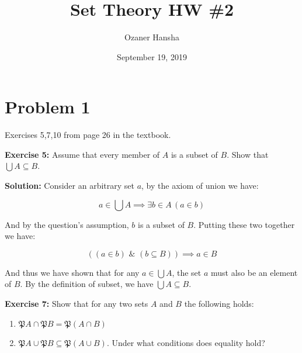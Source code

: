 \documentclass{article}
\begin{document}
\title{Set Theory HW \#2}
\author{Ozaner Hansha}
\date{September 19, 2019}
\maketitle

\newcommand{\pset}[1]{\mathfrak P#1}
\newcommand{\psetp}[1]{\mathfrak P(#1)}
\newcommand{\and}{\,\,\&\,\,}
\newcommand{\OR}{\text{ or }}
\newcommand{\pair}[2]{<#1,#2>}
\renewcommand{\setminus}{-}


\section*{Problem 1}
Exercises 5,7,10 from page 26 in the textbook.
\bigskip

\noindent\textbf{Exercise 5:} Assume that every member of $A$ is a subset of $B$. Show that $\bigcup A\subseteq B$.
\bigskip

\noindent\textbf{Solution:} Consider an arbitrary set $a$, by the axiom of union we have: 

\begin{equation*}
    a\in\bigcup A\implies \exists b\in A\, (a\in b)
\end{equation*}

And by the question's assumption, $b$ is a subset of $B$. Putting these two together we have:

\begin{equation*}
    ((a\in b)\and (b\subseteq B))\implies a\in B\tag{def. of subset}
\end{equation*}

And thus we have shown that for any $a\in\bigcup A$, the set $a$ must also be an element of $B$. By the definition of subset, we have $\bigcup A\subseteq B$.

\bigskip

\noindent\textbf{Exercise 7:} Show that for any two sets $A$ and $B$ the following holds:

\begin{enumerate}[label=\alph*)]
    \item $\pset A\cap\pset B=\psetp{A\cap B}$
    \item $\pset A\cup\pset B\subseteq\psetp{A\cup B}$. Under what conditions does equality hold?
\end{enumerate}
\smallskip
\end{document}
